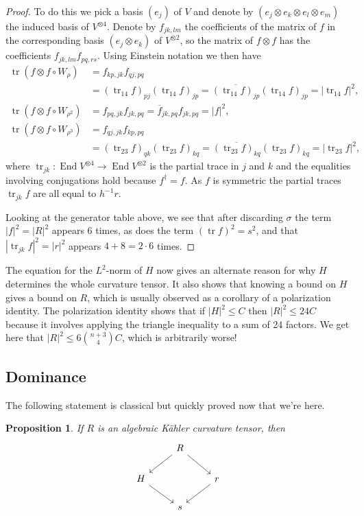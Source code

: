 \documentclass[10pt,a4paper]{amsart}
\newtheorem{prop}[theo]{Proposition}
\theoremstyle{definition}
\def\ov#1{\overline{#1}}
\DeclareMathOperator{\tr}{tr}
\DeclareMathOperator{\End}{End}
\begin{document}
\begin{proof}
To do this we pick a basis $(e_j)$ of $V$ and denote by $(e_j
\otimes e_k \otimes e_l \otimes e_m)$ the induced basis of $V^{\otimes 4}$.
Denote by $f_{jk,lm}$ the coefficients of the matrix of $f$ in the
corresponding basis $(e_j \otimes e_k)$ of $V^{\otimes 2}$, so the matrix of
$f \otimes f$ has the coefficients $f_{jk,lm} f_{pq,rs}$.
Using Einstein notation we then have
\begin{align*}
\tr(f \otimes f \circ W_{\rho})
&= f_{kp,jk} f_{qj,pq}
\\
&= (\tr_{14} f)_{pj} (\tr_{14} f)_{jp}
= \ov{(\tr_{14} f)_{jp}} (\tr_{14} f)_{jp}
= |\! \tr_{14} f|^2,
\\
\tr(f \otimes f \circ W_{\rho^2})
&= f_{pq,jk} f_{jk,pq}
= \ov f_{\! jk,pq} f_{jk,pq}
= |f|^2,
\\
\tr(f \otimes f \circ W_{\rho^3})
&= f_{qj,jk} f_{kp,pq}
\\
&= (\tr_{23} f)_{qk} (\tr_{23} f)_{kq}
= \ov{(\tr_{23} f)_{kq}} (\tr_{23} f)_{kq}
= |\! \tr_{23} f|^2,
\end{align*}
where $\tr_{jk} : \End V^{\otimes 4} \to \End V^{\otimes 2}$ is the partial
trace in $j$ and $k$ and the equalities involving conjugations hold because
$f^\dagger = f$. As $f$ is symmetric the partial traces $\tr_{jk} f$ are all
equal to $h^{-1} r$.

Looking at the generator table above, we see that after discarding $\sigma$
the term $|f|^2 = |R|^2$ appears 6 times, as does the term $(\tr f)^2 = s^2$,
and that $|\!\tr_{jk} f|^2 = |r|^2$ appears $4 + 8 = 2 \cdot 6$ times.
\end{proof}

The equation for the $L^2$-norm of $H$ now gives an alternate reason for why
$H$ determines the whole curvature tensor.
It also shows that knowing a bound on $H$ gives a bound on $R$, which is
usually observed as a corollary of a polarization identity.
The polarization identity shows that if $|H|^2 \leq C$ then $|R|^2 \leq
24 C$ because it involves applying the triangle inequality to a sum of 24 factors.
We get here that $|R|^2 \leq 6\binom{n+3}{4} C$, which is arbitrarily worse!


\subsection*{Dominance}

The following statement is classical but quickly proved now that we're here.

\begin{prop}
\label{prop:dominance}
If $R$ is an algebraic K\"ahler curvature tensor, then
$$
\begin{tikzcd}
& R \ar[dl] \ar[dr] &
\\
H \ar[dr] & & r \ar[dl]
\\
& s &
\end{tikzcd}
$$
\end{prop}
\end{document}
